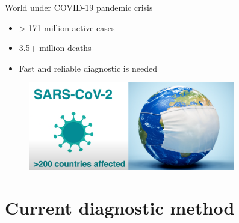 \begin{frame}{World under COVID-19 pandemic crisis}

\begin{itemize}
   \item > 171 million active cases
	\item 3.5+ million deaths
	\item Fast and reliable diagnostic is needed
\end{itemize}

	\begin{figure}
		
		\includegraphics[width=9.0cm]{figures/raman_covid_intro.png}
	\end{figure}


\end{frame}

\section{Current diagnostic method} %

